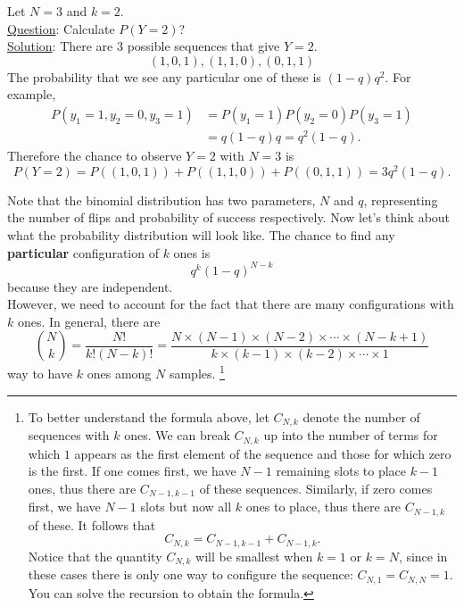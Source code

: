  \begin{example}
Let $N=3$ and $k=2$. \\

\noindent
\underline{Question}: Calculate $P(Y=2)$?\\

\noindent
\underline{Solution}: There are 3 possible sequences that give $Y=2$. 
\begin{equation*}
(1,0,1),(1,1,0),(0,1,1)
\end{equation*}
The probability that we see any particular one of these is $(1-q)q^2$. For example, 
\begin{align*}
P(y_1 = 1,y_2 = 0,y_3 = 1) &= P(y_1 = 1)P(y_2=0)P(y_3 =1) \\
&= q(1-q)q = q^2(1-q).
\end{align*}
Therefore the chance to observe $Y=2$ with $N=3$ is
\begin{equation*}
P(Y=2) = P((1,0,1)) +P((1,1,0))  + P((0,1,1))  =  3q^2(1-q). 
\end{equation*}


 \end{example}
 
 Note that the binomial distribution has two parameters, $N$ and $q$, representing the number of flips and probability of success respectively. 
 Now let's think about what the probability distribution will look like. The chance to find any {\bf particular} configuration of $k$ ones is 
\begin{equation*}
q^k(1-q)^{N-k}
\end{equation*}
 because they are independent. \\
 
 \noindent
However, we need to account for the fact that there are many configurations with $k$ ones. In general, there are 
\begin{equation*}
{N \choose k} = \frac{N!}{k!(N-k)!} = \frac{N \times (N-1) \times (N-2) \times \cdots \times (N-k+1)}{k \times (k-1) \times (k-2) \times \cdots \times 1}
\end{equation*}
way to have $k$ ones among $N$ samples. 
\footnote{To better understand the formula above, let $C_{N,k}$ denote the number of sequences with $k$ ones. We can break $C_{N,k}$ up into the number of terms for which $1$ appears as the first element of the sequence and those for which zero is the first. If one comes first, we have $N-1$ remaining slots to place $k-1$ ones, thus there are $C_{N-1,k-1}$ of these sequences. Similarly, if zero comes first, we have $N-1$ slots but now all $k$ ones to place, thus there are $C_{N-1,k}$ of these. It follows that 
\begin{equation*}
C_{N,k} = C_{N-1,k-1} + C_{N-1,k}. 
\end{equation*}
Notice that the quantity $C_{N,k}$ will be smallest when $k=1$ or $k=N$, since in these cases there is only one way to configure the sequence: $C_{N,1} = C_{N,N} = 1$.  You can solve the recursion to obtain the formula. }
%

